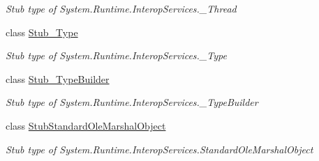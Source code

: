 \begin{DoxyCompactItemize}
\begin{DoxyCompactList}\small\item\em Stub type of System.\-Runtime.\-Interop\-Services.\-\_\-\-Thread\end{DoxyCompactList}\item 
class \hyperlink{class_system_1_1_runtime_1_1_interop_services_1_1_fakes_1_1_stub___type}{Stub\-\_\-\-Type}
\begin{DoxyCompactList}\small\item\em Stub type of System.\-Runtime.\-Interop\-Services.\-\_\-\-Type\end{DoxyCompactList}\item 
class \hyperlink{class_system_1_1_runtime_1_1_interop_services_1_1_fakes_1_1_stub___type_builder}{Stub\-\_\-\-Type\-Builder}
\begin{DoxyCompactList}\small\item\em Stub type of System.\-Runtime.\-Interop\-Services.\-\_\-\-Type\-Builder\end{DoxyCompactList}\item 
class \hyperlink{class_system_1_1_runtime_1_1_interop_services_1_1_fakes_1_1_stub_standard_ole_marshal_object}{Stub\-Standard\-Ole\-Marshal\-Object}
\begin{DoxyCompactList}\small\item\em Stub type of System.\-Runtime.\-Interop\-Services.\-Standard\-Ole\-Marshal\-Object\end{DoxyCompactList}\end{DoxyCompactItemize}
